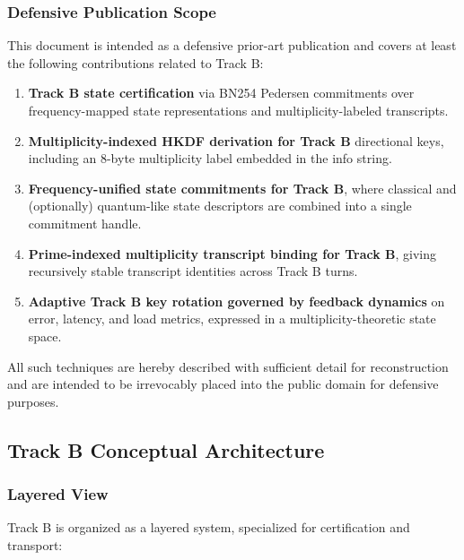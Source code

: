\documentclass[11pt]{article}
\begin{document}
\subsubsection{Defensive Publication Scope}

This document is intended as a defensive prior-art publication and covers at least the following contributions related to Track B:

\begin{enumerate}[leftmargin=1.5em,label=\textbf{B.\arabic*}]
  \item \textbf{Track B state certification} via BN254 Pedersen commitments over frequency-mapped state representations and multiplicity-labeled transcripts.
  \item \textbf{Multiplicity-indexed HKDF derivation for Track B} directional keys, including an 8-byte multiplicity label embedded in the info string.
  \item \textbf{Frequency-unified state commitments for Track B}, where classical and (optionally) quantum-like state descriptors are combined into a single commitment handle.
  \item \textbf{Prime-indexed multiplicity transcript binding for Track B}, giving recursively stable transcript identities across Track B turns.
  \item \textbf{Adaptive Track B key rotation governed by feedback dynamics} on error, latency, and load metrics, expressed in a multiplicity-theoretic state space.
\end{enumerate}

All such techniques are hereby described with sufficient detail for reconstruction and are intended to be irrevocably placed into the public domain for defensive purposes.

\subsection{Track B Conceptual Architecture}

\subsubsection{Layered View}

Track B is organized as a layered system, specialized for certification and transport:
\end{document}
